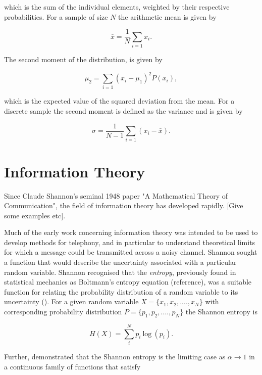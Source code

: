 \noindent which is the sum of the individual elements, weighted by their respective probabilities. For a sample of size $N$ the arithmetic mean is given by 

\begin{equation}
\bar{x} = \frac{1}{N}\sum_{i=1}{x_i}.
\end{equation}

\noindent The second moment of the distribution, is given by

\begin{equation}
\mu_2 = \sum_{i=1}{(x_i - \mu_1)^{2}P(x_i)},
\end{equation}

\noindent which is the expected value of the squared deviation from the mean. For a discrete sample the second moment is defined as the variance and is given by 

\begin{equation}
\sigma = \frac{1}{N-1}\sum_{i=1}{(x_i - \bar{x})}.
\end{equation}

\section{Information Theory}

Since Claude Shannon's seminal 1948 paper "A Mathematical Theory of Communication", the field of information theory has developed rapidly. [Give some examples etc].

 Much of the early work concerning information theory was intended to be used to develop methods for telephony, and in particular to understand theoretical limits for which a message could be transmitted across a noisy channel. Shannon sought a function that would describe the uncertainty associated with a particular random variable. Shannon recognised that the \textit{entropy}, previously found in statistical mechanics as Boltmann's entropy equation (reference), was a suitable function for relating the probability distribution of a random variable to its uncertainty (\cite{shannon2001mathematical}). For a given random variable $X = \{x_1, x_2, ...., x_N\}$ with corresponding probability distribution $P = \{p_1, p_2, ...., p_N\}$ the Shannon entropy is 

\begin{equation}
	H(X) = \sum_i^N{p_i \: \text{log} \: (p_i)}.
\end{equation}

\noindent Further, \cite{rrnyi1961measures} demonstrated that the Shannon entropy is the limiting case as $\alpha \rightarrow 1$ in a continuous family of functions that satisfy

